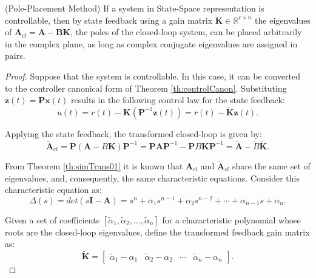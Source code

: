 \documentclass[a4paper,11pt]{book}
\numberwithin{figure}{chapter}
\numberwithin{equation}{chapter}
\numberwithin{table}{chapter}
\newtheorem{theorem}{Theorem}[chapter]
\theoremstyle{definition}
\newcounter{boxed-theorem}
\newenvironment{boxed-theorem}[1]
{\colorlet{shadecolor}{pastelBlue2!10} \begin{shaded} \begin{theorem}{#1}}
{\end{theorem} \end{shaded}}
\newcounter{boxed-definition}
\newcounter{boxed-example}
\begin{document}
\begin{boxed-theorem}{(Pole-Placement Method)} \label{th:polePlace}
    If a system in State-Space representation is controllable, then by state feedback using a gain matrix $\bm{K} \in \mathbb{R}^{r \times n}$ the eigenvalues of $\bm{A}_{cl}=\bm{A}-\bm{B}\bm{K}$, the poles of the closed-loop system, can be placed arbitrarily in the complex plane, as long as complex conjugate eigenvalues are assigned in pairs.
\end{boxed-theorem} 

\begin{proof}
    Suppose that the system is controllable. In this case, it can be converted to the controller canonical form of Theorem \ref{th:controlCanon}. Substituting $\bm{z}(t) = \bm{P} \bm{x}(t)$ results in the following control law for the state feedback:
    \begin{equation}
        u(t) = r(t) - \bm{K} \left( \bm{P}^{-1} \bm{z}(t) \right) = r(t) - \tilde{\bm{K}} \bm{z}(t)
    .\end{equation}
    
    \noindent Applying the state feedback, the transformed closed-loop is given by:
    \begin{equation} \label{eq:fdbckContrCanon}
    \tilde{\bm{A}}_{cl} = \bm{P} (\bm{A} - B \bm{K}) \bm{P}^{-1} = \bm{P} \bm{A} \bm{P}^{-1} - \bm{P} B \bm{K} \bm{P}^{-1} = \tilde{\bm{A}} - \tilde{B} \tilde{\bm{K}}
    .\end{equation}   
    
    \noindent From Theorem \ref{th:simTrans01} it is known that $\bm{A}_{cl}$ and $\tilde{\bm{A}}_{cl}$ share the same set of eigenvalues, and, consequently, the same characteristic equations. Consider this characteristic equation as:
    \begin{equation}
        \Delta(s) = det(s\bm{I} - \bm{A}) = s^n + \alpha_1 s^{n-1} + \alpha_2 s^{n-2} + \cdots + \alpha_{n-1} s + \alpha_n
    .\end{equation}
    
    \noindent Given a set of coefficients $[\tilde{\alpha}_1, \tilde{\alpha}_2, ..., \tilde{\alpha}_n]$ for a characteristic polynomial whose roots are the closed-loop eigenvalues, define the transformed feedback gain matrix as:
    \begin{equation}
        \tilde{\bm{K}} = \begin{bmatrix} \tilde{\alpha}_1 - \alpha_1 & \tilde{\alpha}_2 - \alpha_2 & \cdots & \tilde{\alpha}_n - \alpha_n \end{bmatrix}
    .\end{equation}
    

\end{proof}
\end{document}
